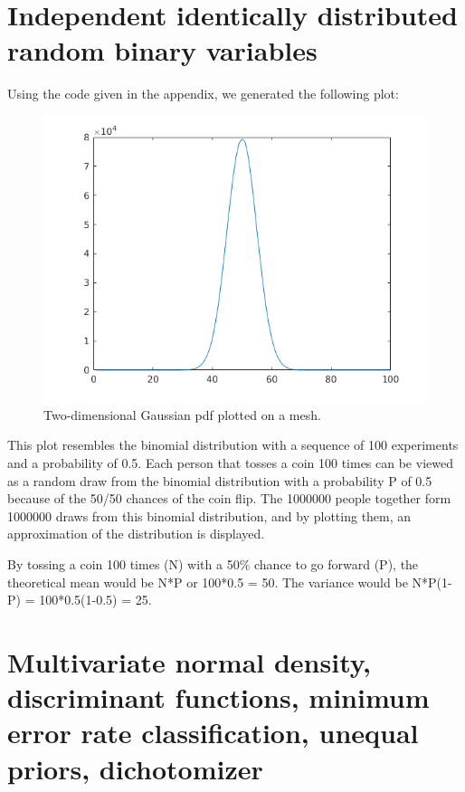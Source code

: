 \documentclass[10pt]{article}
\begin{document}
\section{Independent identically distributed random binary variables}
Using the code given in the appendix, we generated the following plot:
\begin{figure}[H]
 \centering
 \includegraphics[width=.7\textwidth]{Ass4.png}
 \caption{Two-dimensional Gaussian pdf plotted on a mesh.}
 \label{4}
\end{figure}

This plot resembles the binomial distribution with a sequence of 100 experiments and a probability of 0.5. 
Each person that tosses a coin 100 times can be viewed as a random draw
from the binomial distribution with a probability P of 0.5 because of the 50/50 chances of the coin flip.
The 1000000 people together form 1000000 draws from this binomial
distribution, and by plotting them, an approximation of the distribution
is displayed.

By tossing a coin 100 times (N) with a 50\% chance to go forward (P),
the theoretical mean would be N*P or 100*0.5 = 50.
The variance would be N*P(1-P) = 100*0.5(1-0.5) = 25.

\section{Multivariate normal density, discriminant functions, minimum error rate classification, unequal priors, dichotomizer}
\end{document}
